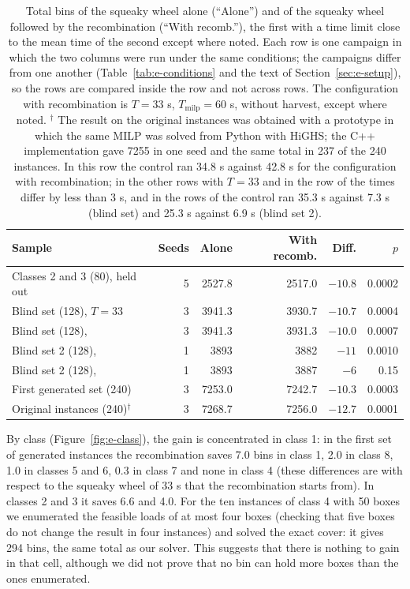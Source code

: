 \begin{table}[t]
\centering
\small\setlength{\tabcolsep}{4pt}
\caption{Total bins of the squeaky wheel alone (``Alone'') and of the squeaky wheel followed by the recombination (``With recomb.''), the first with a time limit close to the mean time of the second except where noted. Each row is one campaign in which the two columns were run
under the same conditions; the campaigns differ from one another (Table~\ref{tab:e-conditions} and the text of Section~\ref{sec:e-setup}), so the rows are compared inside the row and not across rows. The configuration with recombination is
$T=33$ s, $T_{\mathrm{milp}}=60$ s, without harvest, except where noted. $^\dagger$ The result on the original instances was obtained with a prototype in which the
same MILP was solved from Python with HiGHS; the C++ implementation gave 7255 in one seed and the same total in 237 of the 240 instances. In this row the control ran 34.8 s
against 42.8 s for the configuration with recombination; in the other rows with $T=33$ and in the row of \cfgbal{} the times differ by less than 3 s, and in the rows of \cfgfast{} the control ran 35.3 s against 7.3 s (blind set) and 25.3 s against 6.9 s (blind set 2).}
\label{tab:e-milp}
\begin{tabular}{@{}lrrrrr@{}}
\toprule
Sample & Seeds & Alone & With recomb. & Diff. & $p$\\
\midrule
Classes 2 and 3 (80), held out & 5 & 2527.8 & 2517.0 & $-10.8$ & 0.0002\\
Blind set (128), $T=33$ & 3 & 3941.3 & 3930.7 & $-10.7$ & 0.0004\\
Blind set (128), \cfgfast{} & 3 & 3941.3 & 3931.3 & $-10.0$ & 0.0007\\
Blind set 2 (128), \cfgbal{} & 1 & 3893 & 3882 & $-11$ & 0.0010\\
Blind set 2 (128), \cfgfast{} & 1 & 3893 & 3887 & $-6$ & 0.15\\
First generated set (240) & 3 & 7253.0 & 7242.7 & $-10.3$ & 0.0003\\
Original instances (240)$^\dagger$ & 3 & 7268.7 & 7256.0 & $-12.7$ & 0.0001\\
\bottomrule
\end{tabular}
\end{table}

By class (Figure~\ref{fig:e-class}), the gain is concentrated in class 1: in the first set of generated instances the recombination saves 7.0 bins in class 1, 2.0 in class 8, 1.0 in classes 5 and 6, 0.3 in class 7 and none in class 4
(these differences are with respect to the squeaky wheel of 33 s that the recombination starts from). In classes 2 and 3 it saves 6.6 and 4.0.
For the ten instances of class 4 with 50 boxes we enumerated the feasible loads of at most four boxes (checking that
five boxes do not change the result in four instances) and solved the exact cover: it gives 294 bins, the same total as our solver. This suggests that there is nothing to gain in that cell, although we did not prove that no bin can hold more boxes
than the ones enumerated.

